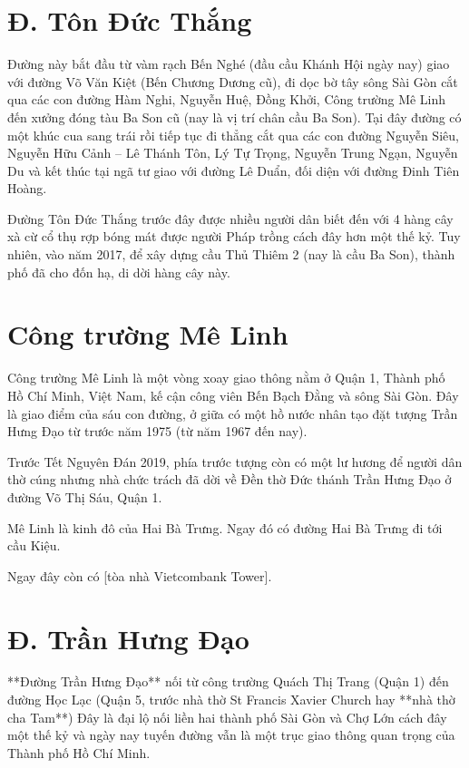 \section{Đ. Tôn Đức Thắng}

Đường này bắt đầu từ vàm rạch Bến Nghé (đầu cầu Khánh Hội ngày nay) giao với đường Võ Văn Kiệt (Bến Chương Dương cũ), đi dọc bờ tây sông Sài Gòn cắt qua các con đường Hàm Nghi, Nguyễn Huệ, Đồng Khởi, Công trường Mê Linh đến xưởng đóng tàu Ba Son cũ (nay là vị trí chân cầu Ba Son). Tại đây đường có một khúc cua sang trái rồi tiếp tục đi thẳng cắt qua các con đường Nguyễn Siêu, Nguyễn Hữu Cảnh – Lê Thánh Tôn, Lý Tự Trọng, Nguyễn Trung Ngạn, Nguyễn Du và kết thúc tại ngã tư giao với đường Lê Duẩn, đối diện với đường Đinh Tiên Hoàng.

Đường Tôn Đức Thắng trước đây được nhiều người dân biết đến với 4 hàng cây xà cừ cổ thụ rợp bóng mát được người Pháp trồng cách đây hơn một thế kỷ. Tuy nhiên, vào năm 2017, để xây dựng cầu Thủ Thiêm 2 (nay là cầu Ba Son), thành phố đã cho đốn hạ, di dời hàng cây này.

\section{Công trường Mê Linh}

Công trường Mê Linh là một vòng xoay giao thông nằm ở Quận 1, Thành phố Hồ Chí Minh, Việt Nam, kế cận công viên Bến Bạch Đằng và sông Sài Gòn. Đây là giao điểm của sáu con đường, ở giữa có một hồ nước nhân tạo đặt tượng Trần Hưng Đạo từ trước năm 1975 (từ năm 1967 đến nay).

Trước Tết Nguyên Đán 2019, phía trước tượng còn có một lư hương để người dân thờ cúng nhưng nhà chức trách đã dời về Đền thờ Đức thánh Trần Hưng Đạo ở đường Võ Thị Sáu, Quận 1.

Mê Linh là kinh đô của Hai Bà Trưng. Ngay đó có đường Hai Bà Trưng đi tới cầu Kiệu.

Ngay đây còn có [tòa nhà Vietcombank Tower].

\section{Đ. Trần Hưng Đạo}

**Đường Trần Hưng Đạo** nối từ công trường Quách Thị Trang (Quận 1) đến đường Học Lạc (Quận 5, trước nhà thờ St Francis Xavier Church hay **nhà thờ cha Tam**) Đây là đại lộ nối liền hai thành phố Sài Gòn và Chợ Lớn cách đây một thế kỷ và ngày nay tuyến đường vẫn là một trục giao thông quan trọng của Thành phố Hồ Chí Minh.

